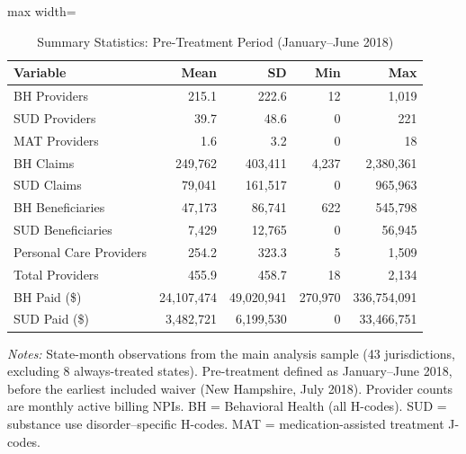 \begin{table}[htbp]
\centering
\caption{Summary Statistics: Pre-Treatment Period (January--June 2018)}
\label{tab:sumstats}
\begin{threeparttable}
\begin{adjustbox}{max width=\textwidth}
\begin{tabular}{lrrrr}
\toprule
Variable & Mean & SD & Min & Max \\
\midrule
BH Providers &        215.1 &        222.6 &      12 &       1,019 \\
SUD Providers &         39.7 &         48.6 &       0 &         221 \\
MAT Providers &          1.6 &          3.2 &       0 &          18 \\
BH Claims &    249,762 &    403,411 &   4,237 &   2,380,361 \\
SUD Claims &     79,041 &    161,517 &       0 &     965,963 \\
BH Beneficiaries &     47,173 &     86,741 &     622 &     545,798 \\
SUD Beneficiaries &      7,429 &     12,765 &       0 &      56,945 \\
Personal Care Providers &        254.2 &        323.3 &       5 &       1,509 \\
Total Providers &        455.9 &        458.7 &      18 &       2,134 \\
BH Paid (\$) & 24,107,474 & 49,020,941 & 270,970 & 336,754,091 \\
SUD Paid (\$) &  3,482,721 &  6,199,530 &       0 &  33,466,751 \\
\bottomrule
\end{tabular}
\end{adjustbox}
\begin{tablenotes}[flushleft]
\small
\item \textit{Notes:} State-month observations from the main analysis sample (43 jurisdictions, excluding 8 always-treated states). Pre-treatment defined as January--June 2018, before the earliest included waiver (New Hampshire, July 2018). Provider counts are monthly active billing NPIs. BH = Behavioral Health (all H-codes). SUD = substance use disorder--specific H-codes. MAT = medication-assisted treatment J-codes.
\end{tablenotes}
\end{threeparttable}
\end{table}
